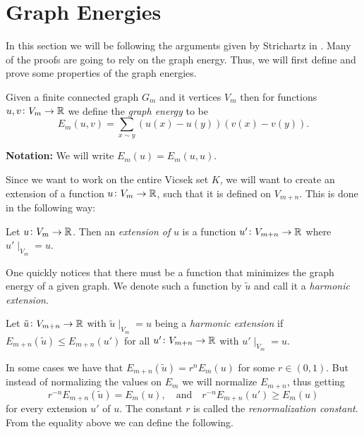 \section{Graph Energies}
In this section we will be following the arguments given by Strichartz in \cite[Chapter 1]{strichartz}. Many of the proofs are going to rely on the graph energy. Thus, we will first define and prove some properties of the graph energies.

\medskip
\begin{defi}
	Given a finite connected graph $G_m$ and it vertices $V_m$ then for functions $u, v\colon V_m \to \mathbb{R}$ we define the \emph{graph energy} to be
	\begin{equation}\label{graphEnergy}
		E_m(u,v) = \sum_{x \sim y} \left(u(x) - u(y) \right)(v(x)-v(y)).
	\end{equation}
\end{defi}
\textbf{Notation:} We will write $E_m(u) = E_m(u,u)$.

\medskip
 Since we want to work on the entire Vicsek set $K$, we will want to create an extension of a function $u\colon V_m \to \mathbb{R}$, such that it is defined on $V_{m+n}$. This is done in the following way:

\medskip
\begin{defi}
	Let $u\colon V_m \to \mathbb{R}$. Then an \emph{extension of} $u$ is a function $u'\colon V_{m+n} \to \mathbb{R}$ where $u' \mid_{V_m} = u$.
\end{defi}
  One quickly notices that there must be a function that minimizes the graph energy of a given graph. We denote such a function by $\tilde{u}$ and call it a \emph{harmonic extension}.

\medskip
\begin{defi}
	Let $\tilde{u}\colon V_{m+n} \to \mathbb{R}$ with $\tilde{u} \mid_{V_m} = u$ being a \emph{harmonic extension} if \\ $E_{m+n}(\tilde{u}) \leq E_{m+n}(u')$ for all $u'\colon V_{m+n} \to \mathbb{R}$ with $u' \mid _{V_m} = u$.
\end{defi}

 In some cases we have that $E_{m+n}(\tilde{u}) = r^{n} E_{m}(u)$ for some $r \in (0,1)$. But instead of normalizing the values on $E_m$ we will normalize $E_{m+n}$, thus  getting
\begin{equation}
	r^{-n} E_{m+n}(\tilde{u}) = E_m(u), \quad \text{and} \quad r^{-n} E_{m+n}(u') \geq E_m(u)
\end{equation}
for every extension $u'$ of $u$. The constant $r$ is called the \emph{renormalization constant}. From the equality above we can define the following.

